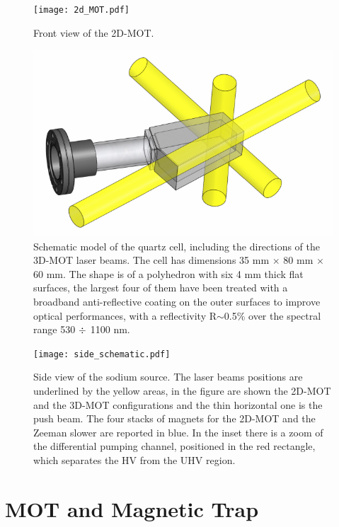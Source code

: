 \documentclass[../thesis.tex]{subfiles}
\begin{document}
\newpage

\begin{figure}[!htb]
\centering
\texttt{[image: 2d\_MOT.pdf]}
\caption{Front view of the 2D-MOT.}
\label{fig:2d_front}
\end{figure}

\begin{figure}[!htb]
\centering
\includegraphics[scale=0.85]{quartz_cell.pdf}
\caption{Schematic model of the quartz cell, including the directions of the 3D-MOT laser beams. The cell has dimensions 35 mm $\times$ 80 mm $\times$ 60 mm. The shape is of a polyhedron with six 4 mm thick flat surfaces, the largest four of them have been treated with a broadband anti-reflective coating on the outer surfaces to improve optical performances, with a reflectivity R$\sim$0.5\% over the spectral range 530 $\divisionsymbol$ 1100 nm.}
\label{fig:qt_cell}
\end{figure}

\begin{figure}[!htb]
\centering
\texttt{[image: side\_schematic.pdf]}
\caption{Side view of the sodium source. The laser beams positions are underlined by the yellow areas, in the figure are shown the 2D-MOT and the 3D-MOT configurations and the thin horizontal one is the push beam. The four stacks of magnets for the 2D-MOT and the Zeeman slower are reported in blue. In the inset there is a zoom of the differential pumping channel, positioned in the red rectangle, which separates the HV from the UHV region.}
\label{fig:side}
\end{figure}


\section{MOT and Magnetic Trap}
\end{document}
